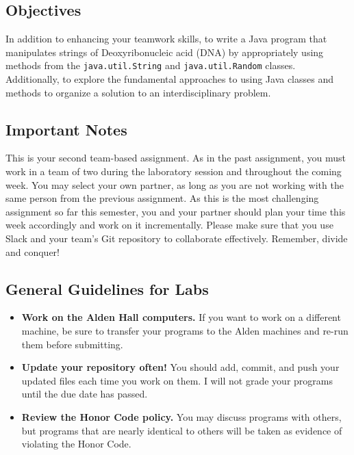 



\subsection*{Objectives}
\vspace{-0.05in}

In addition to enhancing your teamwork skills, to write a Java program that manipulates strings of Deoxyribonucleic acid
(DNA) by appropriately using methods from the {\tt java.util.String} and {\tt java.util.Random} classes. Additionally,
to explore the fundamental approaches to using Java classes and methods to organize a solution to an interdisciplinary
problem.

\vspace{-0.05in}
\subsection*{Important Notes}
\vspace{-0.05in}

This is your second team-based assignment. As in the past assignment, you must work in a team of two during the
laboratory session and throughout the coming week. You may select your own partner, as long as you are not working with
the same person from the previous assignment.  As this is the most challenging assignment so far this semester, you and
your partner should plan your time this week accordingly and work on it incrementally. Please make sure that you use
Slack and your team's Git repository to collaborate effectively. Remember, divide and conquer!

\vspace{-0.05in}
\subsection*{General Guidelines for Labs}
\vspace{-0.05in}

\begin{itemize}

  \itemsep 0in

\item
{\bf Work on the Alden Hall computers.} If you want to work on a different
machine, be sure to transfer your programs to the Alden
machines and re-run them before submitting.
\item
{\bf Update your repository often!} You should add, commit,
and push your updated files each time you work on them.  I will not grade
your programs until the due date has passed.
\item
{\bf Review the Honor Code policy.} You
may discuss programs with others, but programs that are nearly identical
to others will be taken as evidence of violating the Honor Code.
\end{itemize}

